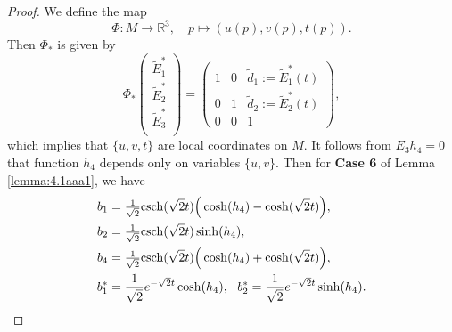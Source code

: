 \documentclass[reqno]{amsart}%
\theoremstyle{definition}
\numberwithin{equation}{section}
\begin{document}
\begin{proof}
We define the map
$$
\Phi: M \longrightarrow \mathbb{R}^{3},
\quad p \mapsto(u(p),v(p),t(p)).
$$
Then $\Phi_*$ is given by
\begin{equation}\label{eqn:dPhi6}
\Phi_*\left(
        \begin{array}{c}
          \tilde{E}_1^* \\
          \tilde{E}_2^* \\
          \tilde{E}_3^* \\
        \end{array}
      \right)
=\left(\begin{array}{cccc}
1 & 0 & \tilde{d}_1:=\tilde{E}_1^*(t) \\
0 & 1 & \tilde{d}_2:=\tilde{E}_2^*(t) \\
0 & 0 & 1
\end{array}\right),
\end{equation}
which implies that $\{u,v,t\}$ are
local coordinates on $M$. It follows from $E_3h_4=0$ that function $h_4$ depends only on variables $\{u,v\}$. Then for {\bf Case 6} of Lemma \ref{lemma:4.1aaa1},
we have
%
\begin{equation}\label{eqn:bijth6}
\begin{aligned}
b_1&=\tfrac{1}{\sqrt{2}}{\rm csch}(\sqrt{2}t)\Big(\cosh(h_4)-\cosh(\sqrt{2}t)\Big),\\
b_2&=\tfrac{1}{\sqrt{2}}{\rm csch}(\sqrt{2}t)\sinh(h_4),\\
b_4&=\tfrac{1}{\sqrt{2}}{\rm csch}(\sqrt{2}t)\Big(\cosh(h_4)+\cosh(\sqrt{2}t)\Big),\\
b_1^*&=\frac{1}{\sqrt{2}}e^{-\sqrt{2}t}\cosh(h_4),\ \
b_2^*=\frac{1}{\sqrt{2}}e^{-\sqrt{2}t}\sinh(h_4).
\end{aligned}
\end{equation}


\end{proof}
\end{document}
